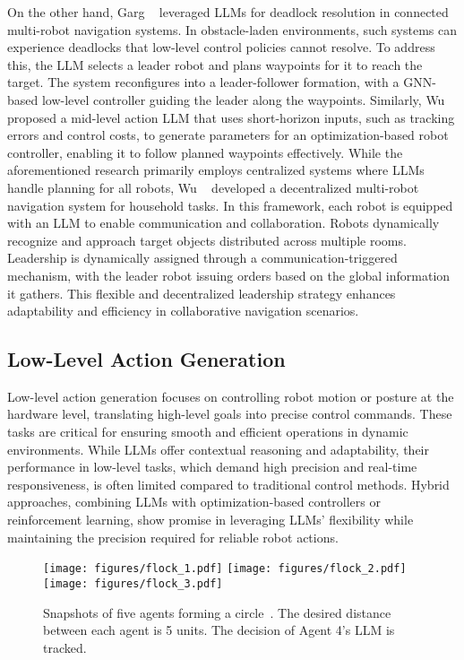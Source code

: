 On the other hand, Garg \etal~\cite{garg_foundation_2024} leveraged LLMs for deadlock resolution in connected multi-robot navigation systems. In obstacle-laden environments, such systems can experience deadlocks that low-level control policies cannot resolve. To address this, the LLM selects a leader robot and plans waypoints for it to reach the target. The system reconfigures into a leader-follower formation, with a GNN-based low-level controller guiding the leader along the waypoints. 
Similarly, Wu \etal~\cite{wu_hierarchical_2024} proposed a mid-level action LLM that uses short-horizon inputs, such as tracking errors and control costs, to generate parameters for an optimization-based robot controller, enabling it to follow planned waypoints effectively.
While the aforementioned research primarily employs centralized systems where LLMs handle planning for all robots, Wu \etal~\cite{wu_camon_2024} developed a decentralized multi-robot navigation system for household tasks. In this framework, each robot is equipped with an LLM to enable communication and collaboration. Robots dynamically recognize and approach target objects distributed across multiple rooms. Leadership is dynamically assigned through a communication-triggered mechanism, with the leader robot issuing orders based on the global information it gathers. This flexible and decentralized leadership strategy enhances adaptability and efficiency in collaborative navigation scenarios.


\subsection{Low-Level Action Generation}
Low-level action generation focuses on controlling robot motion or posture at the hardware level, translating high-level goals into precise control commands. These tasks are critical for ensuring smooth and efficient operations in dynamic environments. While LLMs offer contextual reasoning and adaptability, their performance in low-level tasks, which demand high precision and real-time responsiveness, is often limited compared to traditional control methods. Hybrid approaches, combining LLMs with optimization-based controllers or reinforcement learning, show promise in leveraging LLMs' flexibility while maintaining the precision required for reliable robot actions.

\begin{figure}[tb!]
\centering
    \texttt{[image: figures/flock\_1.pdf]}
    \texttt{[image: figures/flock\_2.pdf]}
    \texttt{[image: figures/flock\_3.pdf]}

    \vspace{2mm}
    \caption{Snapshots of five agents forming a circle~\cite{li_challenges_2024}. The desired distance between each agent is 5 units. The decision of Agent 4's LLM is tracked.}
    \label{fig:Li}
\end{figure}

